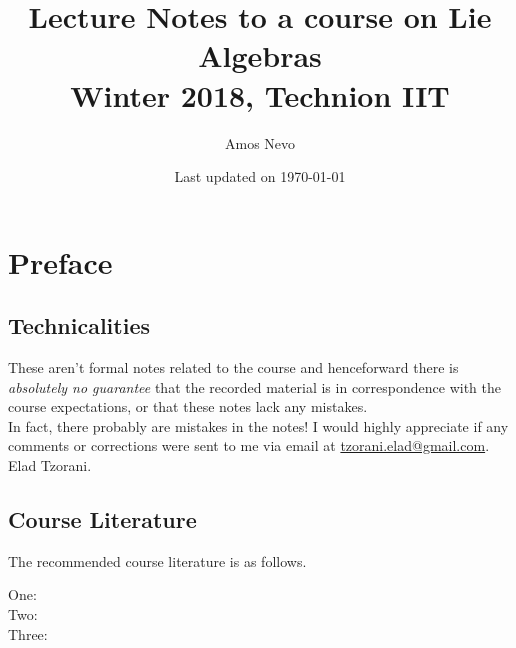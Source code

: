 \documentclass[10pt,a4paper,twoside,openany,hidelinks]{book}
\title{Lecture Notes to a course on Lie Algebras \\ \small{Winter 2018, Technion IIT}}
\author{Amos Nevo}
\date{Last updated on \today}
\begin{document}
\frontmatter
\maketitle
\tableofcontents
\countlectures
\newpage

\chapter*{Preface}
 

\section*{Technicalities}

These aren't formal notes related to the course and henceforward there is \emph{absolutely no guarantee} that the recorded material is in correspondence with the course expectations, or that these notes lack any mistakes.\\
In fact, there probably are mistakes in the notes! I would highly appreciate if any comments or corrections were sent to me via email at \href{mailto:tzorani.elad@gmail.com}{tzorani.elad@gmail.com}.\\
Elad Tzorani.

\section*{Course Literature}

The recommended course literature is as follows.
\begin{description}
\item[One:]

\item[Two:]

\item[Three:]
\end{description}

\mainmatter


\backmatter
\end{document}
